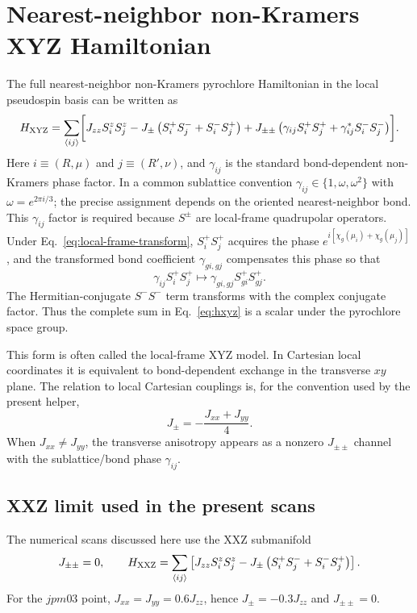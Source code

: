 \documentclass[11pt]{article}
\newcommand{\Jzz}{J_{zz}}
\newcommand{\Jpm}{J_{\pm}}
\newcommand{\Jpmpm}{J_{\pm\pm}}
\begin{document}
\section{Nearest-neighbor non-Kramers XYZ Hamiltonian}

The full nearest-neighbor non-Kramers pyrochlore Hamiltonian in the local
pseudospin basis can be written as
\begin{equation}
  H_{\rm XYZ}
  =
  \sum_{\langle i j\rangle}
  \biggl[
  \Jzz S^z_i S^z_j
  -
  \Jpm\left(S^+_iS^-_j+S^-_iS^+_j\right)
  +
  \Jpmpm\left(
    \gamma_{ij} S^+_iS^+_j
    +
    \gamma_{ij}^{*} S^-_iS^-_j
  \right)
  \biggr].
  \label{eq:hxyz}
\end{equation}
Here $i\equiv(R,\mu)$ and $j\equiv(R',\nu)$, and $\gamma_{ij}$ is the standard
bond-dependent non-Kramers phase factor.  In a common sublattice convention
$\gamma_{ij}\in\{1,\omega,\omega^2\}$ with $\omega=e^{2\pi i/3}$; the precise
assignment depends on the oriented nearest-neighbor bond.  This
$\gamma_{ij}$ factor is required because $S^\pm$ are local-frame quadrupolar
operators.  Under Eq.~\eqref{eq:local-frame-transform},
$S^+_iS^+_j$ acquires the phase
$e^{i[\chi_g(\mu_i)+\chi_g(\mu_j)]}$, and the transformed bond coefficient
$\gamma_{g i,g j}$ compensates this phase so that
\begin{equation}
  \gamma_{ij} S_i^+S_j^+
  \mapsto
  \gamma_{g i,g j} S_{g i}^+S_{g j}^+ .
\end{equation}
The Hermitian-conjugate $S^-S^-$ term transforms with the complex conjugate
factor.  Thus the complete sum in Eq.~\eqref{eq:hxyz} is a scalar under the
pyrochlore space group.

This form is often called the local-frame XYZ model.  In Cartesian local
coordinates it is equivalent to bond-dependent exchange in the transverse
$xy$ plane.  The relation to local Cartesian couplings is, for the convention
used by the present helper,
\begin{equation}
  \Jpm = -\frac{J_{xx}+J_{yy}}{4}.
\end{equation}
When $J_{xx}\neq J_{yy}$, the transverse anisotropy appears as a nonzero
$\Jpmpm$ channel with the sublattice/bond phase $\gamma_{ij}$.

\subsection{XXZ limit used in the present scans}

The numerical scans discussed here use the XXZ submanifold
\begin{equation}
  \Jpmpm=0,\qquad
  H_{\rm XXZ}
  =
  \sum_{\langle i j\rangle}
  \left[
  \Jzz S^z_i S^z_j
  -
  \Jpm\left(S^+_iS^-_j+S^-_iS^+_j\right)
  \right].
  \label{eq:hxxz}
\end{equation}
For the $jpm03$ point, $J_{xx}=J_{yy}=0.6\Jzz$, hence $\Jpm=-0.3\Jzz$ and
$\Jpmpm=0$.
\end{document}

